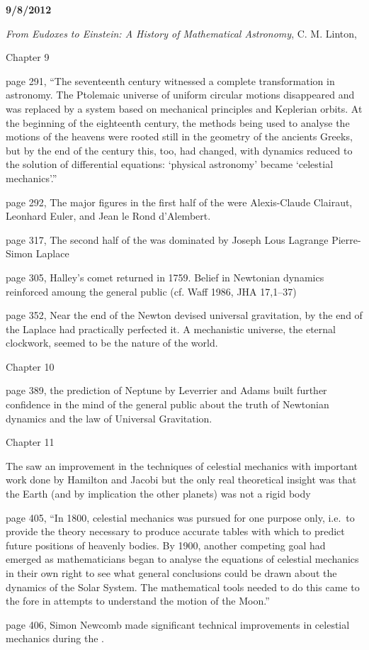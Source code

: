 {\bf 9/8/2012}

\emph{From Eudoxes to Einstein: A History of
Mathematical Astronomy}, C. M. Linton, \cite{linton:2004}

Chapter 9

page 291, ``The seventeenth century witnessed a complete
transformation in astronomy.  The Ptolemaic universe of uniform
circular motions disappeared and was replaced by a system based on
mechanical principles and Keplerian orbits. At the beginning of the
eighteenth century, the methods being used to analyse the motions of
the heavens were rooted still in the geometry of the ancients Greeks,
but by the end of the century this, too, had changed, with dynamics
reduced to the solution of differential equations: `physical
astronomy' became `celestial mechanics'.''

page 292, The major figures in the first half of the  were
Alexis-Claude Clairaut, Leonhard Euler, and Jean le Rond d'Alembert.

page 317, The second half of the  was dominated by Joseph Lous
Lagrange Pierre-Simon Laplace

page 305, Halley's comet returned in 1759. Belief in Newtonian
dynamics reinforced amoung the general public (cf. Waff 1986, JHA
17,1--37)

page 352, Near the end of the  Newton devised universal
gravitation, by the end of the  Laplace had practically
perfected it. A mechanistic universe, the eternal clockwork, seemed to
be the nature of the world.

Chapter 10

page 389, the prediction of Neptune by Leverrier and Adams built
further confidence in the mind of the general public about the truth
of Newtonian dynamics and the law of Universal Gravitation.

Chapter 11

The  saw an improvement in the techniques of celestial
mechanics with important work done by Hamilton and Jacobi but the
only real theoretical insight was that the Earth (and by implication
the other planets) was not a rigid body

page 405, ``In 1800, celestial mechanics was pursued for one purpose
only, i.e.\ to provide the theory necessary to produce accurate tables
with which to predict future positions of heavenly bodies. By 1900,
another competing goal had emerged as mathematicians began to analyse
the equations of celestial mechanics in their own right to see what
general conclusions could be drawn about the dynamics of the Solar
System.  The mathematical tools needed to do this came to the fore in
attempts to understand the motion of the Moon.''

page 406, Simon Newcomb made significant technical improvements
in celestial mechanics during the .


